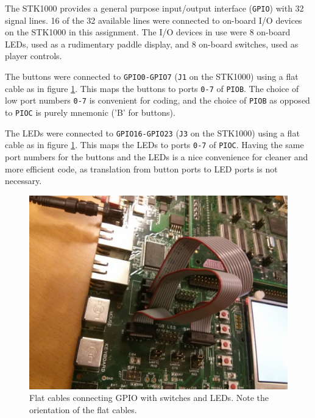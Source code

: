 The STK1000 provides a general purpose input/output interface (\texttt{GPIO}) with 32 signal lines.
16 of the 32 available lines were connected to on-board I/O devices on the STK1000 in this assignment.
The I/O devices in use were 8 on-board LEDs, used as a rudimentary paddle display, and 8 on-board switches, used as player controls.

The buttons were connected to \texttt{GPIO0-GPIO7} (\texttt{J1} on the STK1000) using a flat cable as in figure \ref{flat-cable-image}. This maps the buttons to ports \texttt{0-7} of \texttt{PIOB}.
The choice of low port numbers \texttt{0-7} is convenient for coding, and the choice of \texttt{PIOB} as opposed to \texttt{PIOC} is purely mnemonic ('B' for buttons).

The LEDs were connected to \texttt{GPIO16-GPIO23} (\texttt{J3} on the STK1000) using a flat cable as in figure \ref{flat-cable-image}. This maps the LEDs to ports \texttt{0-7} of \texttt{PIOC}.
Having the same port numbers for the buttons and the LEDs is a nice convenience for cleaner and more efficient code, as translation from button ports to LED ports is not necessary.

\begin{figure}
\includegraphics[width = \textwidth]{description-and-methodology/flat-cable-image.jpg}
\caption{Flat cables connecting GPIO with switches and LEDs. Note the orientation of the flat cables.}
\label{flat-cable-image}
\end{figure}
